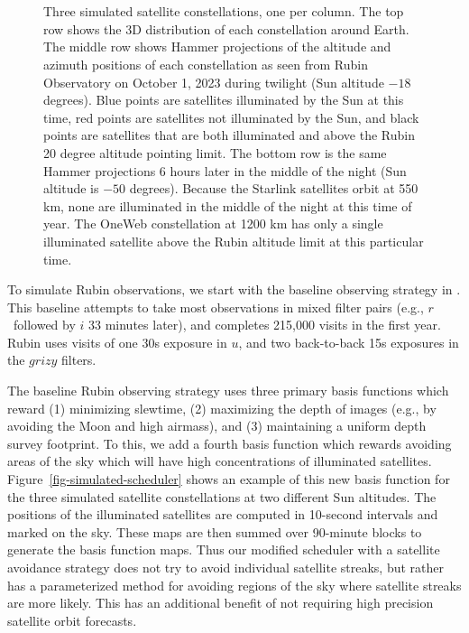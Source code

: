 \documentclass[twocolumn]{aastex631}
\begin{document}
\begin{figure*}[ht!]
\\
\\
\caption{Three simulated satellite constellations, one per column. The top row shows the 3D distribution of each constellation around Earth. The middle row shows Hammer projections of the altitude and azimuth positions of each constellation as seen from Rubin Observatory on October 1, 2023 during twilight (Sun altitude $-18$ degrees). Blue points are satellites illuminated by the Sun at this time, red points are satellites not illuminated by the Sun, and black points are satellites that are both illuminated and above the Rubin 20 degree altitude pointing limit. The bottom row is the same Hammer projections 6 hours later in the middle of the night (Sun altitude is $-50$ degrees). Because the Starlink satellites orbit at 550 km, none are illuminated in the middle of the night at this time of year. The OneWeb constellation at 1200 km has only a single illuminated satellite above the Rubin altitude limit at this particular time.
\label{fig-simulated-constellations}
}
\end{figure*}

To simulate Rubin observations, we start with the baseline observing strategy in \citet{yoachim2022b}. This baseline attempts to take most observations in mixed filter pairs (e.g., $r$\ followed by $i$ 33 minutes later), and completes 215,000 visits in the first year. Rubin uses visits of one 30s exposure in $u$, and two back-to-back 15s exposures in the $grizy$ filters. 

The baseline Rubin observing strategy uses three primary basis functions which reward (1) minimizing slewtime, (2) maximizing the depth of images (e.g., by avoiding the Moon and high airmass), and (3) maintaining a uniform depth survey footprint. To this, we add a fourth basis function which rewards avoiding areas of the sky which will have high concentrations of illuminated satellites. Figure~\ref{fig-simulated-scheduler} shows an example of this new basis function for the three simulated satellite constellations at two different Sun altitudes. The positions of the illuminated satellites are computed in 10-second intervals and marked on the sky. These maps are then summed over 90-minute blocks to generate the basis function maps. Thus our modified scheduler with a satellite avoidance strategy does not try to avoid individual satellite streaks, but rather has a parameterized method for avoiding regions of the sky where satellite streaks are more likely. This has an additional benefit of not requiring high precision satellite orbit forecasts.
\end{document}
